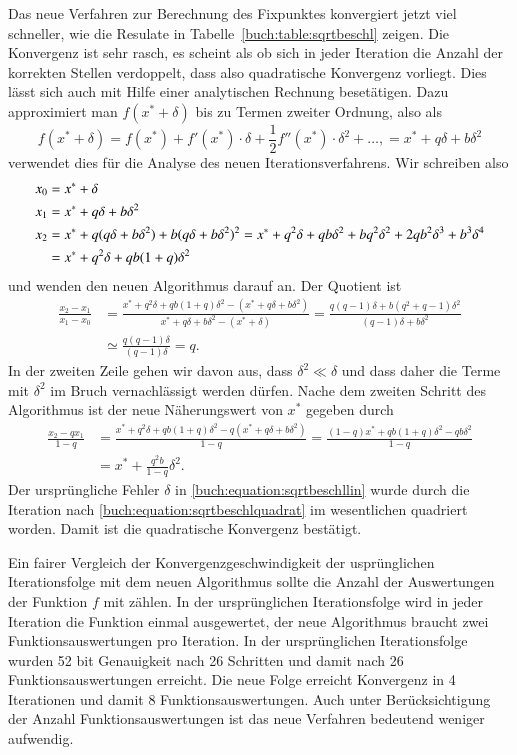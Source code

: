 Das neue Verfahren zur Berechnung des Fixpunktes konvergiert jetzt
viel schneller, wie die Resulate in Tabelle~\ref{buch:table:sqrtbeschl}
zeigen.
Die Konvergenz ist sehr rasch, es scheint als ob sich in jeder
Iteration die Anzahl der korrekten Stellen verdoppelt, dass also
quadratische Konvergenz vorliegt.
Dies lässt sich auch mit Hilfe einer analytischen Rechnung
besetätigen.
Dazu approximiert man $f(x^*+\delta)$ bis zu Termen zweiter Ordnung,
also als
\[
f(x^*+\delta)
=
f(x^*) + f'(x^*)\cdot \delta + \frac12f''(x^*)\cdot \delta^2+ \dots,
=
x^* + q\delta + b\delta^2
\]
verwendet dies für die Analyse des neuen Iterationsverfahrens.
Wir schreiben also
\begin{align}
x_0
&=
x^* + \delta
\label{buch:equation:sqrtbeschllin}
\\
x_1
&=
x^* + q\delta + b\delta^2
\notag
\\
x_2
&=
x^* + q(q\delta+b\delta^2) + b(q\delta+b\delta^2)^2
     = x^* + q^2 \delta + qb\delta^2 + bq^2\delta^2
	+ 2qb^2\delta^3 + b^3\delta^4
\notag
\\
&=
x^* + q^2\delta + qb(1+q)\delta^2
\notag
\end{align}
und wenden den neuen Algorithmus darauf an.
Der Quotient ist
\begin{align*}
\frac{x_2-x_1}{x_1-x_0}
&=
\frac{x^* + q^2\delta + qb(1+q)\delta^2 - 
(x^* + q\delta + b\delta^2)}{
x^* + q\delta + b\delta^2
-
(x^* + \delta)
}
=
\frac{
q(q-1)\delta + b(q^2+q -1) \delta^2
}{
(q-1)\delta + b\delta^2
}
\\
&\simeq
\frac{q(q-1)\delta}{(q-1)\delta}
=
q.
\end{align*}
In der zweiten Zeile gehen wir davon aus, dass $\delta^2 \ll \delta$ und
dass daher die Terme mit $\delta^2$ im Bruch vernachlässigt werden dürfen.
Nache dem zweiten Schritt des Algorithmus ist der neue Näherungswert
von $x^*$ gegeben durch
\begin{align}
\frac{x_2-qx_1}{1-q}
&=
\frac{
x^* + q^2\delta + qb(1+q)\delta^2
-q(
x^* + q\delta + b\delta^2
)
}{
1-q
}
=
\frac{ (1-q)x^* + qb(1+q)\delta^2 - qb\delta^2 }{1-q}
\label{buch:equation:sqrtnext}
\\
&=
x^* + \frac{q^2b}{1-q}\delta^2.
\label{buch:equation:sqrtbeschlquadrat}
\end{align}
Der ursprüngliche Fehler $\delta$ in 
\eqref{buch:equation:sqrtbeschllin}
wurde
durch die Iteration
nach
\eqref{buch:equation:sqrtbeschlquadrat}
im wesentlichen quadriert worden.
Damit ist die quadratische Konvergenz bestätigt.

Ein fairer Vergleich der Konvergenzgeschwindigkeit der usprünglichen
Iterationsfolge mit dem neuen Algorithmus sollte die Anzahl der
Auswertungen der Funktion $f$ mit zählen. 
In der ursprünglichen Iterationsfolge wird in jeder Iteration die 
Funktion einmal ausgewertet, der neue Algorithmus braucht zwei
Funktionsauswertungen pro Iteration.
In der ursprünglichen Iterationsfolge wurden 52 bit Genauigkeit nach
26 Schritten und damit nach 26 Funktionsauswertungen erreicht.
Die neue Folge erreicht Konvergenz in 4 Iterationen und damit 8
Funktionsauswertungen.
Auch unter Berücksichtigung der Anzahl Funktionsauswertungen ist
das neue Verfahren bedeutend weniger aufwendig.

